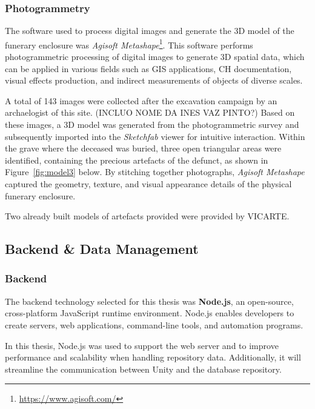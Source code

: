 \subsubsection{Photogrammetry}
\label{sec:photogrammetry_tool} 

The software used to process digital images and generate the \gls{3D} model of the funerary enclosure was \textit{Agisoft Metashape}\footnote{\url{https://www.agisoft.com/}}.
This software performs photogrammetric processing of digital images to generate \gls{3D} spatial data, which can be applied in various fields such as \gls{GIS} applications, \gls{CH} documentation, visual effects production, and indirect measurements of objects of diverse scales. 

 A total of 143 images were collected after the excavation campaign by an archaelogist of this site. (INCLUO NOME DA INES VAZ PINTO?)
Based on these images, a \gls{3D} model was generated from the photogrammetric survey and subsequently imported into the \textit{Sketchfab} viewer for intuitive interaction.
Within the grave where the deceased was buried, three open triangular areas were identified, containing the precious artefacts of the defunct, as shown in Figure~\ref{fig:model3} below.
By stitching together photographs, \textit{Agisoft Metashape} captured the geometry, texture, and visual appearance details of the physical funerary enclosure.

Two already built models of artefacts provided were provided by \gls{VICARTE}.

\subsection{Backend \& Data Management}
\subsubsection{Backend}

The backend technology selected for this thesis was \textbf{Node.js}, an open-source, cross-platform JavaScript runtime environment. 
Node.js enables developers to create servers, web applications, command-line tools, and automation programs.

In this thesis, Node.js was used to support the web server and to improve performance and scalability when handling repository data. 
Additionally, it will streamline the communication between Unity and the database repository.

